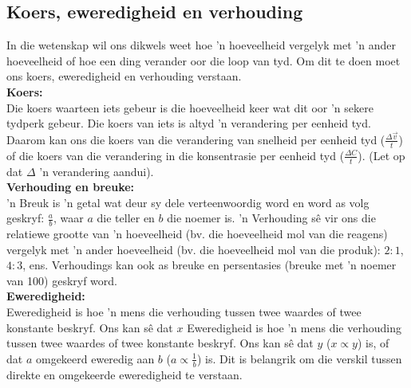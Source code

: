 \subsection*{Koers, eweredigheid en verhouding}
In die wetenskap wil ons dikwels weet hoe  'n hoeveelheid vergelyk met  'n ander hoeveelheid of hoe een ding verander oor die loop van tyd. Om dit te doen moet ons koers, eweredigheid en verhouding verstaan. \\
\textbf{Koers:}\\
Die koers waarteen iets gebeur is die hoeveelheid keer wat dit oor  'n sekere tydperk gebeur. Die koers van iets is altyd  'n verandering per eenheid tyd. Daarom kan ons die koers van die verandering van snelheid per eenheid tyd ($\frac{\Delta \vec{v}}{t}$) of die koers van die verandering in die konsentrasie per eenheid tyd ($\frac{\Delta{C}}{t}$). (Let op dat $\Delta$  'n verandering aandui). \\
\textbf{Verhouding en breuke:}\\
 'n Breuk is  'n getal wat deur sy dele verteenwoordig word en word as volg geskryf: $\frac{a}{b}$, waar $a$ die teller en $b$ die noemer is.  'n Verhouding sê vir ons die relatiewe grootte van  'n hoeveelheid (bv. die hoeveelheid mol van die reagens) vergelyk met  'n ander hoeveelheid (bv. die hoeveelheid mol van die produk): $2:1$, $4:3$, ens. Verhoudings kan ook as breuke en persentasies (breuke met  'n noemer van 100) geskryf word.\\
\textbf{Eweredigheid:}\\
Eweredigheid is hoe  'n mens die verhouding tussen twee waardes of twee konstante beskryf. Ons kan s\^{e} dat $x$ Eweredigheid is hoe  'n mens die verhouding tussen twee waardes of twee konstante beskryf. Ons kan sê dat $y$ ($x \propto y$) is, of dat $a$ omgekeerd eweredig aan $b$ ($a \propto \frac{1}{b}$) is. Dit is belangrik om die verskil tussen direkte en omgekeerde eweredigheid te verstaan.
